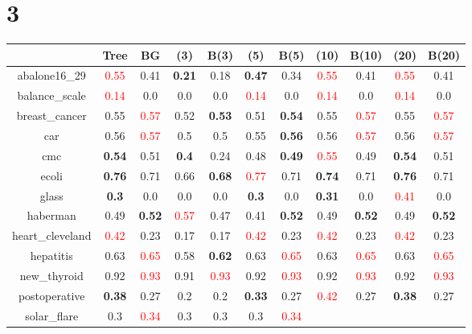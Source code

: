 \documentclass{article}%
\begin{document}
\section*{3}%
\begin{tabular}{c|cccccccccc}%
\hline%
&Tree&BG&(3)&B(3)&(5)&B(5)&(10)&B(10)&(20)&B(20)\\%
\hline%
abalone16\_29&\textcolor{red}{ 
0.55
}&0.41&\textbf{0.21}&0.18&\textbf{0.47}&0.34&\textcolor{red}{ 
0.55
}&0.41&\textcolor{red}{ 
0.55
}&0.41\\%
\hline%
balance\_scale&\textcolor{red}{ 
0.14
}&0.0&0.0&0.0&\textcolor{red}{ 
0.14
}&0.0&\textcolor{red}{ 
0.14
}&0.0&\textcolor{red}{ 
0.14
}&0.0\\%
\hline%
breast\_cancer&0.55&\textcolor{red}{ 
0.57
}&0.52&\textbf{0.53}&0.51&\textbf{0.54}&0.55&\textcolor{red}{ 
0.57
}&0.55&\textcolor{red}{ 
0.57
}\\%
\hline%
car&0.56&\textcolor{red}{ 
0.57
}&0.5&0.5&0.55&\textbf{0.56}&0.56&\textcolor{red}{ 
0.57
}&0.56&\textcolor{red}{ 
0.57
}\\%
\hline%
cmc&\textbf{0.54}&0.51&\textbf{0.4}&0.24&0.48&\textbf{0.49}&\textcolor{red}{ 
0.55
}&0.49&\textbf{0.54}&0.51\\%
\hline%
ecoli&\textbf{0.76}&0.71&0.66&\textbf{0.68}&\textcolor{red}{ 
0.77
}&0.71&\textbf{0.74}&0.71&\textbf{0.76}&0.71\\%
\hline%
glass&\textbf{0.3}&0.0&0.0&0.0&\textbf{0.3}&0.0&\textbf{0.31}&0.0&\textcolor{red}{ 
0.41
}&0.0\\%
\hline%
haberman&0.49&\textbf{0.52}&\textcolor{red}{ 
0.57
}&0.47&0.41&\textbf{0.52}&0.49&\textbf{0.52}&0.49&\textbf{0.52}\\%
\hline%
heart\_cleveland&\textcolor{red}{ 
0.42
}&0.23&0.17&0.17&\textcolor{red}{ 
0.42
}&0.23&\textcolor{red}{ 
0.42
}&0.23&\textcolor{red}{ 
0.42
}&0.23\\%
\hline%
hepatitis&0.63&\textcolor{red}{ 
0.65
}&0.58&\textbf{0.62}&0.63&\textcolor{red}{ 
0.65
}&0.63&\textcolor{red}{ 
0.65
}&0.63&\textcolor{red}{ 
0.65
}\\%
\hline%
new\_thyroid&0.92&\textcolor{red}{ 
0.93
}&0.91&\textcolor{red}{ 
0.93
}&0.92&\textcolor{red}{ 
0.93
}&0.92&\textcolor{red}{ 
0.93
}&0.92&\textcolor{red}{ 
0.93
}\\%
\hline%
postoperative&\textbf{0.38}&0.27&0.2&0.2&\textbf{0.33}&0.27&\textcolor{red}{ 
0.42
}&0.27&\textbf{0.38}&0.27\\%
\hline%
solar\_flare&0.3&\textcolor{red}{ 
0.34
}&0.3&0.3&0.3&\textcolor{red}{ 
0.34
}&\textcolor{red}{ 
}
\end{tabular}
\end{document}
